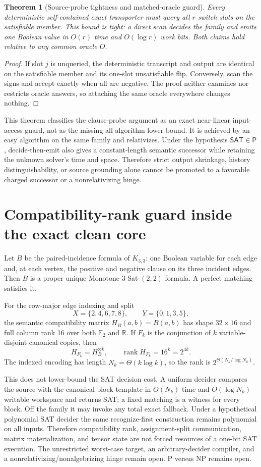 \documentclass[11pt]{article}
\newtheorem{theorem}{Theorem}
\newcommand{\SAT}{\mathsf{SAT}}
\newcommand{\PP}{\mathsf P}
\begin{document}
\begin{theorem}[Source-probe tightness and matched-oracle guard]
Every deterministic self-contained exact transporter must query all
\(r\) switch slots on the satisfiable member.  This bound is tight:
a direct scan decides the family and emits one Boolean value in
\(O(r)\) time and \(O(\log r)\) work bits.  Both claims hold relative
to any common oracle \(O\).
\end{theorem}
\begin{proof}
If slot \(j\) is unqueried, the deterministic transcript and output are
identical on the satisfiable member and its one-slot unsatisfiable flip.
Conversely, scan the signs and accept exactly when all are negative.
The proof neither examines nor restricts oracle answers, so attaching
the same oracle everywhere changes nothing.
\end{proof}

This theorem classifies the clause-probe argument as an exact near-linear
input-access guard, not as the missing all-algorithm lower bound.  It is
achieved by an easy algorithm on the same family and relativizes.
Under the hypothesis \(\SAT\in\PP\), decide-then-emit also gives a
constant-length semantic successor while retaining the unknown solver's
time and space.  Therefore strict output shrinkage, history
distinguishability, or source grounding alone cannot be promoted to a
favorable charged successor or a nonrelativizing hinge.

\section{Compatibility-rank guard inside the exact clean core}
Let $B$ be the paired-incidence formula of $K_{3,3}$: one Boolean variable
for each edge and, at each vertex, the positive and negative clause on its
three incident edges.  Then $B$ is a proper unique Monotone
$3$-Sat-$(2,2)$ formula.  A perfect matching satisfies it.

For the row-major edge indexing and split
\[
 X=\{2,4,6,7,8\},\qquad Y=\{0,1,3,5\},
\]
the semantic compatibility matrix $H_B(a,b)=B(a,b)$ has shape
$32\times16$ and full column rank 16 over both $\mathbb F_2$ and
$\mathbb R$.  If $F_k$ is the conjunction of $k$ variable-disjoint
canonical copies, then
\[
 H_{F_k}=H_B^{\otimes k},\qquad
 \operatorname{rank}H_{F_k}=16^k=2^{4k}.
\]
The indexed encoding has length $N_k=\Theta(k\log k)$, so the rank is
$2^{\Theta(N_k/\log N_k)}$.

This does not lower-bound the SAT decision cost.  A uniform decider compares
the source with the canonical block template in $O(N_k)$ time and
$O(\log N_k)$ writable workspace and returns SAT; a fixed matching is a
witness for every block.  Off the family it may invoke any total exact
fallback.  Under a hypothetical polynomial SAT decider the same
recognize-first construction remains polynomial on all inputs.  Therefore
compatibility rank, assignment-split communication, matrix materialization,
and tensor state are not forced resources of a one-bit SAT execution.
The unrestricted worst-case target, an arbitrary-decider compiler, and a
nonrelativizing/nonalgebrizing hinge remain open.  P versus NP remains open.
\end{document}

